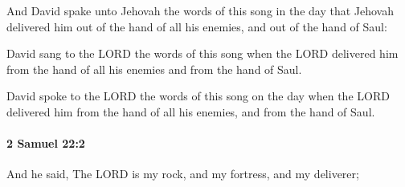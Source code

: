 			\begin{versebox}
					\item[BHS] 
					\item[ASV] And David spake unto Jehovah the words of this song in the day that Jehovah delivered him out of the hand of all his enemies, and out of the hand of Saul:
					\item[NIV] David sang to the LORD the words of this song when the LORD delivered him from the hand of all his enemies and from the hand of Saul.
					\item[NRSV] David spoke to the LORD the words of this song on the day when the LORD delivered him from the hand of all his enemies, and from the hand of Saul.
			\end{versebox}

		\paragraph{2 Samuel 22:2} %
			\label{2SAMUEL-22-2}

			And he said, The LORD is my rock, and my fortress, and my deliverer;

